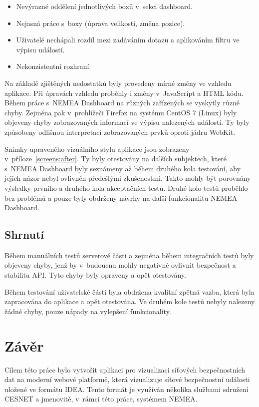 \begin{itemize}
    \item Nevýrazné oddělení jednotlivých boxů v~sekci dashboard.
    \item Nejasná práce s~boxy (úprava velikosti, změna pozice).
    \item Uživatelé nechápali rozdíl mezi zadáváním dotazu a aplikováním filtru ve výpisu událostí.
    \item Nekonzistentní rozhraní.
\end{itemize}

Na základě zjištěných nedostatků byly provedeny mírné změny ve vzhledu aplikace. Při úpravách vzhledu proběhly i změny v~JavaScript a HTML kódu. Během práce s~NEMEA Dashboard na různých zařízených se vyskytly různé chyby. Zejména pak v~prohlížeči Firefox na systému CentOS 7 (Linux) byly objeveny chyby zobrazovaných informací ve výpisu nalezených událostí. Ty byly způsobeny odlišnou interpretací zobrazovaných prvků oproti jádru WebKit. 

Snímky upraveného vizuálního stylu aplikace jsou zobrazeny v~příloze~\ref{screens:after}. Ty byly otestovány na dalších subjektech, které s~NEMEA Dashboard byly seznámeny až během druhého kola testování, aby jejich názor nebyl ovlivněn předešlými zkušenostmi. Takto mohly být porovnány výsledky prvního a druhého kola akceptačních testů. Druhé kolo testů proběhlo bez problémů a pouze byly obdrženy návrhy na další funkcionalitu NEMEA Dashboard.

\section{Shrnutí}

Během manuálních testů serverové části a zejména během integračních testů byly objeveny chyby, jenž by v~budoucnu mohly negativně ovlivnit bezpečnost a stabilitu API. Tyto chyby byly opraveny a opět otestovány. 

Během testování uživatelské části byla obdržena kvalitní zpětná vazba, která byla zapracována do aplikace a opět otestována. Ve druhém kole testů nebyly nalezeny žádné chyby, pouze nápady na vylepšení funkcionality.  

\chapter{Závěr}

Cílem této práce bylo vytvořit aplikaci pro vizualizaci síťových bezpečnostních dat na moderní webové platformě, která vizualizuje síťové bezpečnostní události uložené ve formátu IDEA. Tento formát je využíván několika službami sdružení CESNET a jmenovitě, v~rámci této práce, systémem NEMEA. 

